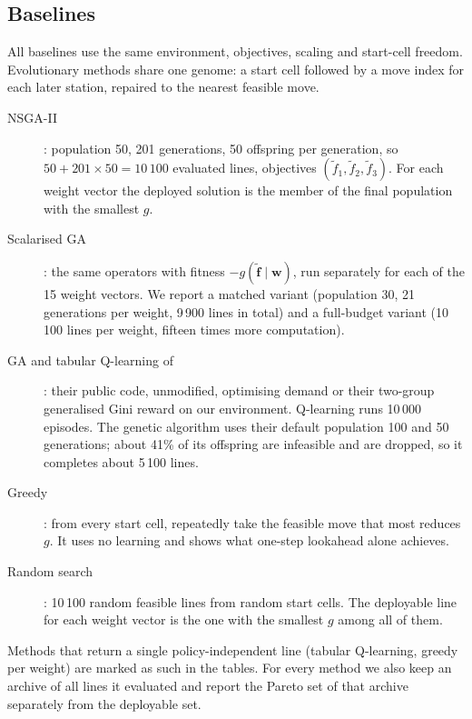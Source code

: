 \subsection{Baselines}\label{sec:baselines}
All baselines use the same environment, objectives, scaling and start-cell freedom. Evolutionary methods share one genome: a start cell followed by a move index for each later station, repaired to the nearest feasible move.
\begin{description}
\item[NSGA-II] \citep{deb2002}: population 50, 201 generations, 50 offspring per generation, so $50+201\times 50=10\,100$ evaluated lines, objectives $(\tilde f_1,\tilde f_2,\tilde f_3)$. For each weight vector the deployed solution is the member of the final population with the smallest $g$.
\item[Scalarised GA]: the same operators with fitness $-g(\tilde{\mathbf f}\mid\mathbf w)$, run separately for each of the 15 weight vectors. We report a matched variant (population 30, 21 generations per weight, 9\,900 lines in total) and a full-budget variant (10\,100 lines per weight, fifteen times more computation).
\item[GA and tabular Q-learning of \citet{michailidis2026}]: their public code, unmodified, optimising demand or their two-group generalised Gini reward on our environment. Q-learning runs 10\,000 episodes. The genetic algorithm uses their default population 100 and 50 generations; about 41\% of its offspring are infeasible and are dropped, so it completes about 5\,100 lines.
\item[Greedy]: from every start cell, repeatedly take the feasible move that most reduces $g$. It uses no learning and shows what one-step lookahead alone achieves.
\item[Random search]: 10\,100 random feasible lines from random start cells. The deployable line for each weight vector is the one with the smallest $g$ among all of them.
\end{description}
Methods that return a single policy-independent line (tabular Q-learning, greedy per weight) are marked as such in the tables. For every method we also keep an archive of all lines it evaluated and report the Pareto set of that archive separately from the deployable set.
